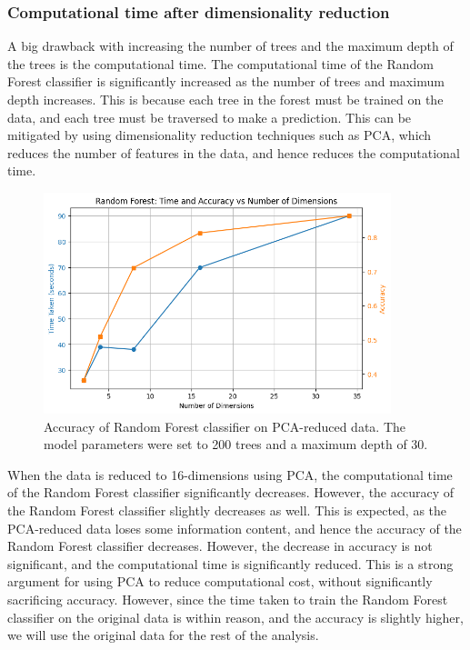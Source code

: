 \documentclass[12pt]{article}
\begin{document}
\vspace{20pt}

\subsubsection{Computational time after dimensionality reduction}
\noindent
A big drawback with increasing the number of trees and the maximum depth of the trees is the computational time. The computational time of the Random Forest classifier is significantly increased as the number of trees and maximum depth increases. This is because each tree in the forest must be trained on the data, and each tree must be traversed to make a prediction. This can be mitigated by using dimensionality reduction techniques such as PCA, which reduces the number of features in the data, and hence reduces the computational time.

\begin{figure}[H]
\centering
\includegraphics[width=0.9\textwidth]{figures/rf_accuracy_pca.png}
\caption{Accuracy of Random Forest classifier on PCA-reduced data. The model parameters were set to 200 trees and a maximum depth of 30.}
\label{fig:rf_accuracy_pca}
\end{figure}

When the data is reduced to 16-dimensions using PCA, the computational time of the Random Forest classifier significantly decreases. However, the accuracy of the Random Forest classifier slightly decreases as well. This is expected, as the PCA-reduced data loses some information content, and hence the accuracy of the Random Forest classifier decreases. However, the decrease in accuracy is not significant, and the computational time is significantly reduced. This is a strong argument for using PCA to reduce computational cost, without significantly sacrificing accuracy. However, since the time taken to train the Random Forest classifier on the original data is within reason, and the accuracy is slightly higher, we will use the original data for the rest of the analysis.
\end{document}
